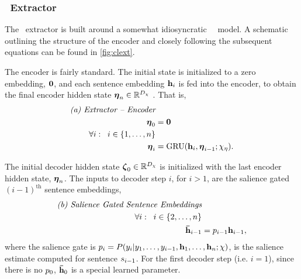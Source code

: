 



\subsubsection{\clext~Extractor}

The \clext~extractor \citep{cheng2016neural} 
is built around a somewhat idiosyncratic 
\unidirectional~\sequencetosequence~model. A schematic outlining the 
structure of the encoder and closely following the subsequent 
equations can be found in \autoref{fig:clext}.

The encoder is fairly standard. The initial state is initialized to
a zero embedding, $\mathbf{0}$, and each sentence embedding $\mathbf{h}_i$ is fed into 
the encoder, to obtain the final encoder hidden state $\boldsymbol{\eta}_n \in \mathbb{R}^{{D_{\chi}}}$ . That is,
\begin{align}
    \textit{(a) Extractor -- Encoder} & \nonumber \\
    \boldsymbol{\eta}_0 & = \mathbf{0} \\
    \forall i : \;\; i \in \{1,\ldots,n\}&\nonumber\\
    \boldsymbol{\eta}_i &= \operatorname{GRU}(\mathbf{h}_i, \boldsymbol{\eta}_{i-1};\chi_\eta).
\end{align}

The initial decoder hidden state $\boldsymbol{\zeta}_0 \in \mathbb{R}^{{D_{\chi}}}$ is 
initialized with the last encoder hidden state, $\boldsymbol{\eta}_n$.
The inputs
to decoder step $i$, for $i >1$, are the salience gated $(i-1)^\textrm{th}$ sentence embeddings,
\begin{align}
    \textit{(b) Salience Gated Sentence Embeddings}&\nonumber\\
    \forall i: \;\; i \in \{2,\dots,n\}& \nonumber\\
    \boldsymbol{\bar{\mathbf{h}}}_{i-1} & = p_{i-1}\mathbf{h}_{i-1},
\end{align}
where the salience gate is 
$p_i = P(y_i|y_1,\ldots,y_{i-1},
                        \mathbf{h}_1,\ldots,\mathbf{h}_n;\chi)$, is the
                        salience estimate computed for sentence $s_{i-1}$.
                        For the first decoder step (i.e. $i=1$), since there is no $p_0$, $\boldsymbol{\bar{\mathbf{h}}}_0$ is a special learned parameter.



